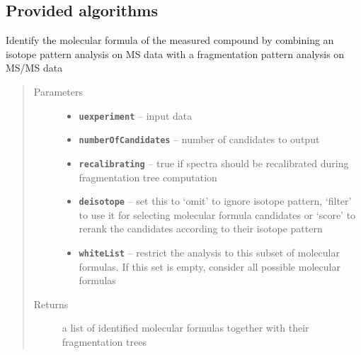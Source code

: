 \documentclass[letterpaper,10pt,openany,oneside]{sphinxmanual}
\begin{document}
\subsection{Provided algorithms}
\label{library:provided-algorithms}

\begin{fulllineitems}
\label{library:de.unijena.bioinf.sirius.identify(Ms2Experiment, int, boolean, IsotopePatternHandling, Set)}
Identify the molecular formula of the measured compound by combining an isotope pattern analysis on MS data with a fragmentation pattern analysis on MS/MS data
\begin{quote}\begin{description}
\item[{Parameters}] \leavevmode\begin{itemize}
\item {} 
\textbf{\texttt{uexperiment}} -- input data

\item {} 
\textbf{\texttt{numberOfCandidates}} -- number of candidates to output

\item {} 
\textbf{\texttt{recalibrating}} -- true if spectra should be recalibrated
during fragmentation tree computation

\item {} 
\textbf{\texttt{deisotope}} -- set this to `omit' to ignore isotope pattern, `filter' to use it for selecting molecular formula candidates or `score' to rerank the candidates according to their isotope pattern

\item {} 
\textbf{\texttt{whiteList}} -- restrict the analysis to this subset of molecular formulas. If this set is empty, consider all possible molecular formulas

\end{itemize}

\item[{Returns}] \leavevmode
a list of identified molecular formulas together with their fragmentation trees

\end{description}\end{quote}

\end{fulllineitems}
\end{document}
